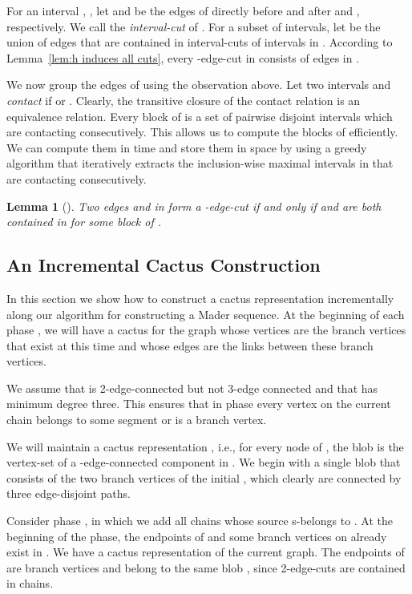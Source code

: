 \documentclass[paper=a4]{scrartcl}
\newtheorem{lemma}{Lemma}
\begin{document}
For an interval , , let  and  be the edges of  directly before and after  and , respectively. We call  the \emph{interval-cut} of . For a subset  of intervals, let  be the union of edges that are contained in interval-cuts of intervals in . According to Lemma~\ref{lem:h induces all cuts}, every -edge-cut in  consists of edges in .

We now group the edges of  using the observation above. Let two intervals  and  \emph{contact} if  or . Clearly, the transitive closure  of the contact relation is an equivalence relation. Every block  of  is a set of pairwise disjoint intervals which are contacting consecutively.
This allows us to compute the blocks of  efficiently. We can compute them in time  and store them in space  by using a greedy algorithm that iteratively extracts the inclusion-wise maximal intervals in  that are contacting consecutively. 


\begin{lemma}[\cite{Nagamochi1992a,Taoka1992,Tsin2009}]
Two edges  and  in  form a -edge-cut if and only if  and  are both contained in  for some block  of .
\end{lemma}










\subsection{An Incremental Cactus Construction}

In this section we show how to construct a cactus representation incrementally along our algorithm for constructing a Mader sequence. At the beginning of each phase , we will have a cactus for the graph  whose vertices are the branch vertices that exist at this time and whose edges are the links between these branch vertices.

We assume that  is 2-edge-connected but not 3-edge connected and that  has minimum degree three. This ensures that in phase  every vertex on the current chain  belongs to some segment or is a branch vertex.

We will maintain a cactus representation , i.e., for every node  of , the blob  is the vertex-set of a -edge-connected component in . We begin with a single blob that consists of the two branch vertices of the initial , which clearly are connected by three edge-disjoint paths.

Consider phase , in which we add all chains whose source s-belongs to . At the beginning of the phase, the endpoints of  and some branch vertices on  already exist in . We have a cactus representation of the current graph. The endpoints of  are branch vertices and belong to the same blob , since 2-edge-cuts are contained in chains.
\end{document}
